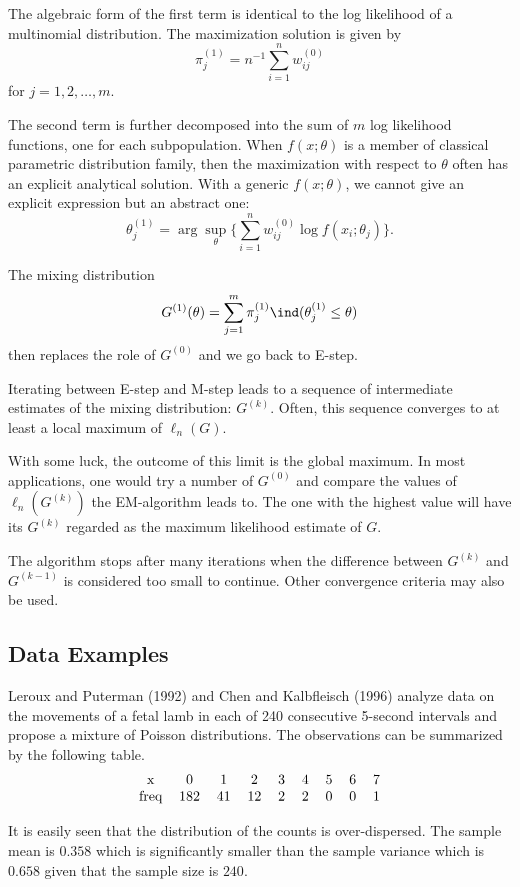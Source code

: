 The algebraic form of the first term is identical to the log likelihood of a multinomial distribution.
The maximization solution is given by
\[
\pi_j^{(1)} = n^{-1} \sum_{i=1}^n w_{ij}^{(0)}
\]
for $j=1, 2, \ldots, m$.

The second term is further decomposed into the sum of $m$
log likelihood functions, one for each subpopulation.
When $f(x; \theta)$ is a member of classical parametric distribution
family, then the maximization with respect to $\theta$ often has
an explicit analytical solution.  With a generic $f(x; \theta)$, we cannot give
an explicit expression but an abstract one:
\[
\theta_j^{(1)} = \arg \sup_\theta \{  \sum_{i=1}^n w_{ij}^{(0)} \log f(x_{i}; \theta_j) \}.
\]

The mixing distribution
\[
G^{(1)}(\theta) = \sum_{j=1}^m \pi_j^{(1)} \ind (\theta_j^{(1)} \leq \theta)
\]
 then replaces the role of $G^{(0)}$ and we go back to E-step.

Iterating between E-step and M-step leads to a sequence of
intermediate estimates of the mixing distribution: $G^{(k)}$. 
Often, this sequence converges
to at least a local maximum of $\ell_n(G)$.

With some luck, the outcome of this limit is the global maximum.
In most applications, one would try a number of $G^{(0)}$
and compare the values of $\ell_n(G^{(k)})$ the EM-algorithm leads to.
The one with the highest value will have its $G^{(k)}$ regarded
as the maximum likelihood estimate of $G$.

The algorithm stops after many iterations
when the difference between $G^{(k)}$ and $G^{(k-1)}$ is considered
too small to continue. Other convergence criteria may also be
used.


\subsection{Data Examples}
Leroux and Puterman (1992)  and Chen and Kalbfleisch (1996)
analyze data on the movements of a fetal lamb in each of
240 consecutive 5-second intervals and propose a mixture of 
Poisson distributions.
The observations can be summarized by the following
table.
\[
\begin{tabular}{ccccccccc}
x & 0 & 1 & 2 & 3 & 4& 5& 6 & 7\\
\mbox{freq}  & 182 & 41 & 12 & 2 &2 & 0& 0 & 1
\end{tabular}
\]

It is easily seen that the distribution of the counts is over-dispersed.
The sample mean is $0.358$ which is significantly
smaller than the sample variance which is $0.658$ given that the
sample size is $240$.

